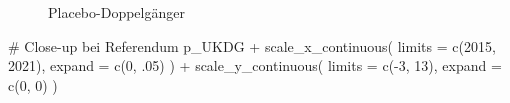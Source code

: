 \documentclass[
  a4paper,
  DIV=11,
  oneside]{scrreprt}
\newenvironment{Shaded}{\begin{snugshade}}{\end{snugshade}}
\newcommand{\AttributeTok}[1]{\textcolor[rgb]{0.40,0.45,0.13}{#1}}
\newcommand{\CommentTok}[1]{\textcolor[rgb]{0.37,0.37,0.37}{#1}}
\newcommand{\DecValTok}[1]{\textcolor[rgb]{0.68,0.00,0.00}{#1}}
\newcommand{\FunctionTok}[1]{\textcolor[rgb]{0.28,0.35,0.67}{#1}}
\newcommand{\NormalTok}[1]{\textcolor[rgb]{0.00,0.23,0.31}{#1}}
\newcommand{\SpecialCharTok}[1]{\textcolor[rgb]{0.37,0.37,0.37}{#1}}
\begin{document}
\begin{figure}[t]


\caption{\label{fig-pdgukbip}Placebo-Doppelgänger}

\end{figure}%

\begin{Shaded}
\begin{Highlighting}[]
\CommentTok{\# Close{-}up bei Referendum}
\NormalTok{p\_UKDG }\SpecialCharTok{+}
      \FunctionTok{scale\_x\_continuous}\NormalTok{(}
      \AttributeTok{limits =} \FunctionTok{c}\NormalTok{(}\DecValTok{2015}\NormalTok{, }\DecValTok{2021}\NormalTok{), }\AttributeTok{expand =} \FunctionTok{c}\NormalTok{(}\DecValTok{0}\NormalTok{, .}\DecValTok{05}\NormalTok{)}
\NormalTok{    ) }\SpecialCharTok{+}
      \FunctionTok{scale\_y\_continuous}\NormalTok{(}
      \AttributeTok{limits =} \FunctionTok{c}\NormalTok{(}\SpecialCharTok{{-}}\DecValTok{3}\NormalTok{, }\DecValTok{13}\NormalTok{),  }\AttributeTok{expand =} \FunctionTok{c}\NormalTok{(}\DecValTok{0}\NormalTok{, }\DecValTok{0}\NormalTok{)}
\NormalTok{    )}
\end{Highlighting}
\end{Shaded}
\end{document}
